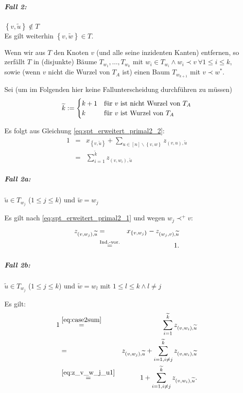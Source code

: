 \documentclass[10p,a4paper,BCOR = 12mm, DIV=15]{scrbook}
\begin{document}
{\begin{bew}
\subparagraph{Fall 2:} $\left\{v, \widetilde{u}\right\}\notin T$ \\
Es gilt weiterhin $\left\{v, \widetilde{w}\right\}\in T$.

Wenn wir aus $T$ den Knoten $v$ (und alle seine inzidenten Kanten) entfernen, so zerfällt $T$ in (disjunkte) Bäume $T_{w_1}, \ldots, T_{w_k}$ mit $w_i\in T_{w_i}\wedge w_i\prec v\ \forall 1\leq i \leq k$, sowie (wenn $v$ nicht die Wurzel von $T_A$ ist) einen Baum $T_{w_{k+1}}$ mit $v\prec w^*$.

Sei (um im Folgenden hier keine Fallunterscheidung durchführen zu müssen)
\begin{displaymath}
\widetilde{k} := \begin{cases}
k+1 & \textnormal{für } v \textnormal{ ist nicht Wurzel von } T_A \\
k & \textnormal{für } v \textnormal{ ist Wurzel von } T_A \\
\end{cases}
\end{displaymath}

Es folgt aus Gleichung \eqref{eq:spt_erweitert_primal2_2}:
\begin{eqnarray}
1 & = & x_{\left\{v, \widetilde{u}\right\}} + \sum_{u\in[n]\backslash\left\{v, w\right\}} z_{\left(v, u\right), \widetilde{u}} \nonumber \\
& = & \sum_{i=1}^{\widetilde{k}} z_{\left(v, w_i\right), \widetilde{u}} \label{eq:case2sum}
\end{eqnarray}

\subparagraph{Fall 2a:} $\widetilde{u}\in T_{w_j}$ ($1\leq j \leq k$) und $\widetilde{w} = w_j$

Es gilt nach \eqref{eq:spt_erweitert_primal2_1} und wegen $w_j \prec^+ v$:
\begin{eqnarray}
z_{\left(v, w_j\right), \widetilde{u}} & = & x_{\left\{v, w_j\right\}} - z_{\left(w_j, v\right), \widetilde{u}} \nonumber \\
& \stackrel{\textnormal{Ind.-vor.}}{=} & 1. \label{eq:z_v_w_j_u1}
\end{eqnarray}

\subparagraph{Fall 2b:} $\widetilde{u}\in T_{w_j}$ ($1\leq j \leq k$) und $\widetilde{w} = w_l$ mit $1\leq l \leq k\wedge l\neq j$

Es gilt:
\begin{eqnarray*}
1 & \stackrel{\eqref{eq:case2sum}}{=} & \sum_{i=1}^{\widetilde{k}} z_{\left(v, w_i\right), \widetilde{u}} \\
& = & z_{\left(v, w_j\right), \widetilde{u}} + \sum_{i=1, i\neq j}^{\widetilde{k}} z_{\left(v, w_i\right), \widetilde{u}} \\
& \stackrel{\eqref{eq:z_v_w_j_u1}}{=} & 1 + \sum_{i=1, i\neq j}^{\widetilde{k}} z_{\left(v, w_i\right), \widetilde{u}}.
\end{eqnarray*}


\end{bew}}
\end{document}
